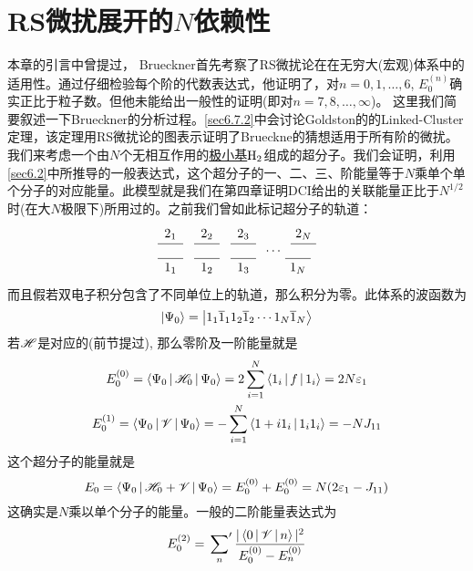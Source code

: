 \section{RS微扰展开的$N$依赖性}
本章的引言中曾提过， Brueckner首先考察了RS微扰论在在无穷大(宏观)体系中的适用性。通过仔细检验每个阶的代数表达式，他证明了，对$n=0,1,\ldots,6$, $E_0^{(n)}$确实正比于粒子数。但他未能给出一般性的证明(即对$n=7,8,\ldots,\infty$)。 这里我们简要叙述一下Brueckner的分析过程。\ref{sec6.7.2}中会讨论Goldston的的Linked-Cluster定理，该定理用RS微扰论的图表示证明了Brueckne的猜想适用于所有阶的微扰。我们来考虑一个由$N$个无相互作用的\underline{极小基$\mathrm{H}_2$}组成的超分子。我们会证明，利用\ref{sec6.2}中所推导的一般表达式，这个超分子的一、二、三、阶能量等于$N$乘单个单个分子的对应能量。此模型就是我们在第四章证明DCI给出的关联能量正比于$N^{1/2}$时(在大$N$极限下)所用过的。之前我们曾如此标记超分子的轨道：
\begin{equation*}
\begin{tikzpicture}
\draw (0,0)--node[below]{$1_1$}++(0.7,0) ++(0.3,0)--node[below]{$1_2$}++(0.7,0) ++(0.3,0)--node[below]{$1_3$}++(0.7,0) ++(0.5,0.2) node{$\cdots$} +(.5,0) ++(0.3,-.2)--node[below]{$1_N$}++(0.7,0);

\draw (0,.4)--node[above]{$2_1$}++(0.7,0) ++(0.3,0)--node[above]{$2_2$}++(0.7,0) ++(0.3,0)--node[above]{$2_3$}++(0.7,0) ++(0.65,0.2)  +(.35,0) ++(0.3,-.2)--node[above]{$2_N$}++(0.7,0);
\end{tikzpicture}
\end{equation*}
而且假若双电子积分包含了不同单位上的轨道，那么积分为零。此体系的\hft 波函数为
\begin{equation}
\Ket{\Psi_0} = \Ket{1_1\overline{1}_1 1_2\overline{1}_2 \cdots 1_N\overline{1}_N}
\end{equation}
若$\mathscr{H}$是对应的\hft \ha(前节提过), 那么零阶及一阶能量就是
\begin{subequations}
\begin{gather}
E_0^{(0)} = \Braket{\Psi_0|\mathscr{H}_0|\Psi_0}=2\sum_{i=1}^{N}\Braket{1_i|f|1_i}=2N\varepsilon_1\\
E_0^{(1)} = \Braket{\Psi_0|\mathscr{V}|\Psi_0}=-\sum_{i=1}^{N}\Braket{1+i1_i|1_i1_i}=-NJ_{11}
\label{6.80b}
\end{gather}
\end{subequations}
这个超分子的\hft 能量就是
\begin{equation}
E_0=\Braket{\Psi_0|\mathscr{H}_0+\mathscr{V}|\Psi_0} = E_0^{(0)} + E_0^{(0)} = N(2\varepsilon_1-J_{11})
\end{equation}
这确实是$N$乘以单个分子的\hft 能量。一般的二阶能量表达式为
\begin{align}
E_0^{(2)} = \sideset{}{'}\sum_n \frac{|\Braket{0|\mathscr{V}|n}|^2}{E_0^{(0)}-E_n^{(0)}}
\end{align}
